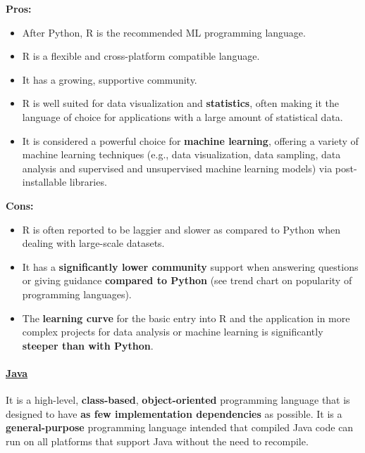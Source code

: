 \documentclass [oneside,10pt,a4paper,ngerman,BCOR10mm,headsepline,parindent,final]{scrartcl}
\providecommand{\tightlist}{%
      \setlength{\itemsep}{0pt}\setlength{\parskip}{0pt}}
\begin{document}
\textbf{Pros:}

\begin{itemize}
\tightlist
\item
  After Python, R is the recommended ML programming language.
\item
  R is a flexible and cross-platform compatible language.
\item
  It has a growing, supportive community.
\item
  R is well suited for data visualization and \textbf{statistics}, often
  making it the language of choice for applications with a large amount
  of statistical data.
\item
  It is considered a powerful choice for \textbf{machine learning},
  offering a variety of machine learning techniques (e.g., data
  visualization, data sampling, data analysis and supervised and
  unsupervised machine learning models) via post-installable libraries.
\end{itemize}

\textbf{Cons:}

\begin{itemize}
\tightlist
\item
  R is often reported to be laggier and slower as compared to Python
  when dealing with large-scale datasets.
\item
  It has a \textbf{significantly lower community} support when answering
  questions or giving guidance \textbf{compared to Python} (see trend
  chart on popularity of programming languages).
\item
  The \textbf{learning curve} for the basic entry into R and the
  application in more complex projects for data analysis or machine
  learning is significantly \textbf{steeper than with Python}.
\end{itemize}

    \hypertarget{java}{%
\paragraph{\texorpdfstring{\href{https://en.wikipedia.org/wiki/Java_(programming_language)}{Java}}{Java}}\label{java}}

It is a high-level, \textbf{class-based}, \textbf{object-oriented}
programming language that is designed to have \textbf{as few
implementation dependencies} as possible. It is a
\textbf{general-purpose} programming language intended that compiled
Java code can run on all platforms that support Java without the need to
recompile.
\end{document}
